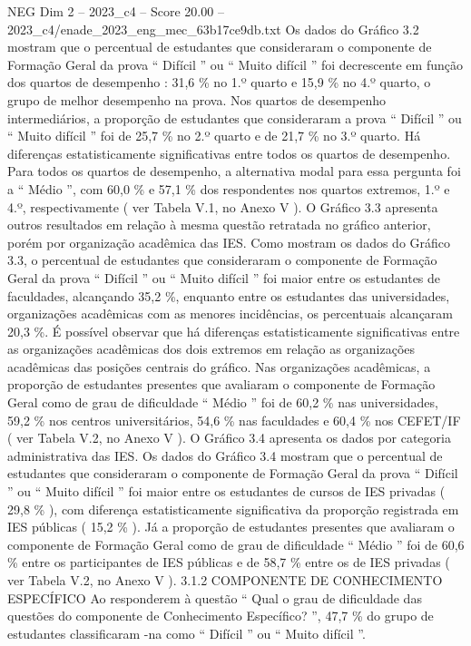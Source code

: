 \begin{textsample}{NEG Dim 2 – 2023\_c4 – Score 20.00 – 2023\_c4/enade\_2023\_eng\_mec\_63b17ce9db.txt}
Os dados do Gráfico 3.2 mostram que o percentual de estudantes que consideraram o componente de Formação Geral da prova “ Difícil ” ou “ Muito difícil ” foi decrescente em função dos quartos de desempenho : 31,6 \% no 1.º quarto e 15,9 \% no 4.º quarto, o grupo de melhor desempenho na prova.
Nos quartos de desempenho intermediários, a proporção de estudantes que consideraram a prova “ Difícil ” ou “ Muito difícil ” foi de 25,7 \% no 2.º quarto e de 21,7 \% no 3.º quarto.
Há diferenças estatisticamente significativas entre todos os quartos de desempenho.
Para todos os quartos de desempenho, a alternativa modal para essa pergunta foi a “ Médio ”, com 60,0 \% e 57,1 \% dos respondentes nos quartos extremos, 1.º e 4.º, respectivamente ( ver Tabela V.1, no Anexo V ).
O Gráfico 3.3 apresenta outros resultados em relação à mesma questão retratada no gráfico anterior, porém por organização acadêmica das IES.
Como mostram os dados do Gráfico 3.3, o percentual de estudantes que consideraram o componente de Formação Geral da prova “ Difícil ” ou “ Muito difícil ” foi maior entre os estudantes de faculdades, alcançando 35,2 \%, enquanto entre os estudantes das universidades, organizações acadêmicas com as menores incidências, os percentuais alcançaram 20,3 \%.
É possível observar que há diferenças estatisticamente significativas entre as organizações acadêmicas dos dois extremos em relação as organizações acadêmicas das posições centrais do gráfico.
Nas organizações acadêmicas, a proporção de estudantes presentes que avaliaram o componente de Formação Geral como de grau de dificuldade “ Médio ” foi de 60,2 \% nas universidades, 59,2 \% nos centros universitários, 54,6 \% nas faculdades e 60,4 \% nos CEFET/IF ( ver Tabela V.2, no Anexo V ).
O Gráfico 3.4 apresenta os dados por categoria administrativa das IES.
Os dados do Gráfico 3.4 mostram que o percentual de estudantes que consideraram o componente de Formação Geral da prova “ Difícil ” ou “ Muito difícil ” foi maior entre os estudantes de cursos de IES privadas ( 29,8 \% ), com diferença estatisticamente significativa da proporção registrada em IES públicas ( 15,2 \% ).
Já a proporção de estudantes presentes que avaliaram o componente de Formação Geral como de grau de dificuldade “ Médio ” foi de 60,6 \% entre os participantes de IES públicas e de 58,7 \% entre os de IES privadas ( ver Tabela V.2, no Anexo V ). 3.1.2 COMPONENTE DE CONHECIMENTO ESPECÍFICO Ao responderem à questão “ Qual o grau de dificuldade das questões do componente de Conhecimento Específico? ”, 47,7 \% do grupo de estudantes classificaram -na como “ Difícil ” ou “ Muito difícil ”.

\end{textsample}

